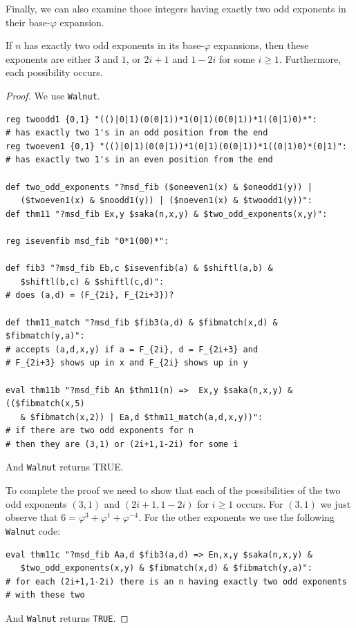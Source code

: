 \documentclass[12pt,reqno]{article}
\begin{document}
Finally, we can also examine those integers having exactly two odd exponents in their base-$\varphi$ expansion.

\begin{theorem}
If $n$ has exactly two odd exponents in its base-$\varphi$ expansions, then these exponents are either
$3$ and $1$, or
$2i+1$ and $1-2i$ for some $i \geq 1$.  Furthermore, each possibility occurs.
\end{theorem}



\begin{proof}
We use {\tt Walnut}.
\begin{verbatim}
reg twoodd1 {0,1} "(()|0|1)(0(0|1))*1(0|1)(0(0|1))*1((0|1)0)*":
# has exactly two 1's in an odd position from the end
reg twoeven1 {0,1} "(()|0|1)(0(0|1))*1(0|1)(0(0|1))*1((0|1)0)*(0|1)":
# has exactly two 1's in an even position from the end

def two_odd_exponents "?msd_fib ($oneeven1(x) & $oneodd1(y)) | 
   ($twoeven1(x) & $noodd1(y)) | ($noeven1(x) & $twoodd1(y))":
def thm11 "?msd_fib Ex,y $saka(n,x,y) & $two_odd_exponents(x,y)":

reg isevenfib msd_fib "0*1(00)*":

def fib3 "?msd_fib Eb,c $isevenfib(a) & $shiftl(a,b) & 
   $shiftl(b,c) & $shiftl(c,d)":
# does (a,d) = (F_{2i}, F_{2i+3})?

def thm11_match "?msd_fib $fib3(a,d) & $fibmatch(x,d) & $fibmatch(y,a)":
# accepts (a,d,x,y) if a = F_{2i}, d = F_{2i+3} and
# F_{2i+3} shows up in x and F_{2i} shows up in y
   
eval thm11b "?msd_fib An $thm11(n) =>  Ex,y $saka(n,x,y) & (($fibmatch(x,5) 
   & $fibmatch(x,2)) | Ea,d $thm11_match(a,d,x,y))":
# if there are two odd exponents for n
# then they are (3,1) or (2i+1,1-2i) for some i
\end{verbatim}
And {\tt Walnut} returns TRUE.

To complete the proof we need to show that each of the possibilities of the two odd exponents $(3,1)$ and
$(2i+1,1-2i)$ for $i \geq 1$ occurs.
For $(3,1)$ we just observe that
$6 = \varphi^3 + \varphi^1 + \varphi^{-4}$.  For the other exponents we use the following {\tt Walnut} code:
\begin{verbatim}
eval thm11c "?msd_fib Aa,d $fib3(a,d) => En,x,y $saka(n,x,y) & 
   $two_odd_exponents(x,y) & $fibmatch(x,d) & $fibmatch(y,a)":
# for each (2i+1,1-2i) there is an n having exactly two odd exponents
# with these two
\end{verbatim}
And {\tt Walnut} returns {\tt TRUE}. 
\end{proof}
\end{document}
